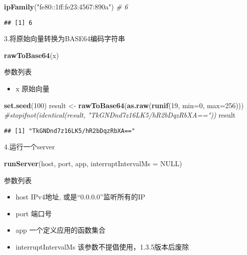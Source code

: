 \documentclass[]{book}
\newenvironment{Shaded}{\begin{snugshade}}{\end{snugshade}}
\newcommand{\KeywordTok}[1]{\textcolor[rgb]{0.13,0.29,0.53}{\textbf{#1}}}
\newcommand{\DataTypeTok}[1]{\textcolor[rgb]{0.13,0.29,0.53}{#1}}
\newcommand{\DecValTok}[1]{\textcolor[rgb]{0.00,0.00,0.81}{#1}}
\newcommand{\StringTok}[1]{\textcolor[rgb]{0.31,0.60,0.02}{#1}}
\newcommand{\CommentTok}[1]{\textcolor[rgb]{0.56,0.35,0.01}{\textit{#1}}}
\newcommand{\OtherTok}[1]{\textcolor[rgb]{0.56,0.35,0.01}{#1}}
\newcommand{\NormalTok}[1]{#1}
\providecommand{\tightlist}{%
  \setlength{\itemsep}{0pt}\setlength{\parskip}{0pt}}
\theoremstyle{definition}
\theoremstyle{definition}
\theoremstyle{definition}
\theoremstyle{remark}
\begin{document}
\begin{Shaded}
\begin{Highlighting}[]
\KeywordTok{ipFamily}\NormalTok{(}\StringTok{"fe80::1ff:fe23:4567:890a"}\NormalTok{) }\CommentTok{# 6}
\end{Highlighting}
\end{Shaded}

\begin{verbatim}
## [1] 6
\end{verbatim}

3.将原始向量转换为BASE64编码字符串

\begin{Shaded}
\begin{Highlighting}[]
\KeywordTok{rawToBase64}\NormalTok{(x)}
\end{Highlighting}
\end{Shaded}

参数列表

\begin{itemize}
\tightlist
\item
  x 原始向量
\end{itemize}

\begin{Shaded}
\begin{Highlighting}[]
\KeywordTok{set.seed}\NormalTok{(}\DecValTok{100}\NormalTok{)}
\NormalTok{result <-}\StringTok{ }\KeywordTok{rawToBase64}\NormalTok{(}\KeywordTok{as.raw}\NormalTok{(}\KeywordTok{runif}\NormalTok{(}\DecValTok{19}\NormalTok{, }\DataTypeTok{min=}\DecValTok{0}\NormalTok{, }\DataTypeTok{max=}\DecValTok{256}\NormalTok{)))}
\CommentTok{#stopifnot(identical(result, "TkGNDnd7z16LK5/hR2bDqzRbXA=="))}
\NormalTok{result}
\end{Highlighting}
\end{Shaded}

\begin{verbatim}
## [1] "TkGNDnd7z16LK5/hR2bDqzRbXA=="
\end{verbatim}

4.运行一个server

\begin{Shaded}
\begin{Highlighting}[]
\KeywordTok{runServer}\NormalTok{(host, port, app, }\DataTypeTok{interruptIntervalMs =} \OtherTok{NULL}\NormalTok{)}
\end{Highlighting}
\end{Shaded}

参数列表

\begin{itemize}
\item
  host IPv4地址, 或是``0.0.0.0''监听所有的IP
\item
  port 端口号
\item
  app 一个定义应用的函数集合
\item
  interruptIntervalMs 该参数不提倡使用，1.3.5版本后废除
\end{itemize}
\end{document}
